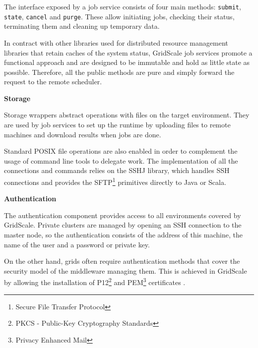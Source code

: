 The interface exposed by a job service consists of four main methods: \verb|submit|, \verb|state|, \verb|cancel| and \verb|purge|. These allow initiating jobs, checking their status, terminating them and cleaning up temporary data. 

In contract with other libraries used for distributed resource management libraries that retain caches of the system status, GridScale job services promote a functional approach and are designed to be immutable and hold as little state as possible. Therefore, all the public methods are pure and simply forward the request to the remote scheduler.

\vspace{3mm}
\textbf{Storage}
\vspace{1mm}

Storage wrappers abstract operations with files on the target environment. They are used by job services to set up the runtime by uploading files to remote machines and download results when jobs are done.

Standard POSIX file operations are also enabled in order to complement the usage of command line tools to delegate work. The implementation of all the connections and commands relies on the SSHJ \cite{SSHJ} library, which handles SSH connections and provides the SFTP\footnote{Secure File Transfer Protocol} primitives directly to Java or Scala.

\vspace{3mm}
\textbf{Authentication}
\vspace{1mm}

The authentication component provides access to all environments covered by GridScale. Private clusters are managed by opening an SSH connection to the master node, so the authentication consists of the address of this machine, the name of the user and a password or private key.

On the other hand, grids often require authentication methods that cover the security model of the middleware managing them. This is achieved in GridScale by allowing the installation of P12\footnote{PKCS - Public-Key Cryptography Standards} and PEM\footnote{Privacy Enhanced Mail} certificates \cite{Reuillon2016}.